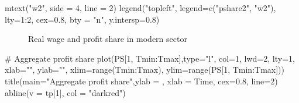 \documentclass[
  letterpaper,
  DIV=11,
  numbers=noendperiod]{scrreprt}
\newenvironment{Shaded}{\begin{snugshade}}{\end{snugshade}}
\newcommand{\AttributeTok}[1]{\textcolor[rgb]{0.40,0.45,0.13}{#1}}
\newcommand{\CommentTok}[1]{\textcolor[rgb]{0.37,0.37,0.37}{#1}}
\newcommand{\DecValTok}[1]{\textcolor[rgb]{0.68,0.00,0.00}{#1}}
\newcommand{\FloatTok}[1]{\textcolor[rgb]{0.68,0.00,0.00}{#1}}
\newcommand{\FunctionTok}[1]{\textcolor[rgb]{0.28,0.35,0.67}{#1}}
\newcommand{\NormalTok}[1]{\textcolor[rgb]{0.00,0.23,0.31}{#1}}
\newcommand{\SpecialCharTok}[1]{\textcolor[rgb]{0.37,0.37,0.37}{#1}}
\newcommand{\StringTok}[1]{\textcolor[rgb]{0.13,0.47,0.30}{#1}}
\begin{document}
\begin{Shaded}
\begin{Highlighting}[]
\FunctionTok{mtext}\NormalTok{(}\StringTok{"w2"}\NormalTok{, }\AttributeTok{side =} \DecValTok{4}\NormalTok{, }\AttributeTok{line =} \DecValTok{2}\NormalTok{)}
\FunctionTok{legend}\NormalTok{(}\StringTok{"topleft"}\NormalTok{, }\AttributeTok{legend=}\FunctionTok{c}\NormalTok{(}\StringTok{"pshare2"}\NormalTok{, }\StringTok{"w2"}\NormalTok{),}
       \AttributeTok{lty=}\DecValTok{1}\SpecialCharTok{:}\DecValTok{2}\NormalTok{, }\AttributeTok{cex=}\FloatTok{0.8}\NormalTok{, }\AttributeTok{bty =} \StringTok{"n"}\NormalTok{, }\AttributeTok{y.intersp=}\FloatTok{0.8}\NormalTok{)}
\end{Highlighting}
\end{Shaded}

\begin{figure}[H]


\caption{\label{fig-wage}Real wage and profit share in modern sector}

\end{figure}%

\begin{Shaded}
\begin{Highlighting}[]
\CommentTok{\# Aggregate profit share}
\FunctionTok{plot}\NormalTok{(PS[}\DecValTok{1}\NormalTok{, Tmin}\SpecialCharTok{:}\NormalTok{Tmax],}\AttributeTok{type=}\StringTok{"l"}\NormalTok{, }\AttributeTok{col=}\DecValTok{1}\NormalTok{, }\AttributeTok{lwd=}\DecValTok{2}\NormalTok{, }\AttributeTok{lty=}\DecValTok{1}\NormalTok{, }\AttributeTok{xlab=}\StringTok{""}\NormalTok{, }\AttributeTok{ylab=}\StringTok{""}\NormalTok{, }\AttributeTok{xlim=}\FunctionTok{range}\NormalTok{(Tmin}\SpecialCharTok{:}\NormalTok{Tmax), }\AttributeTok{ylim=}\FunctionTok{range}\NormalTok{(PS[}\DecValTok{1}\NormalTok{, Tmin}\SpecialCharTok{:}\NormalTok{Tmax])) }
\FunctionTok{title}\NormalTok{(}\AttributeTok{main=}\StringTok{"Aggregate profit share"}\NormalTok{,}\AttributeTok{ylab =} \StringTok{\textquotesingle{}\textquotesingle{}}\NormalTok{, }\AttributeTok{xlab =} \StringTok{\textquotesingle{}Time\textquotesingle{}}\NormalTok{, }\AttributeTok{cex=}\FloatTok{0.8}\NormalTok{, }\AttributeTok{line=}\DecValTok{2}\NormalTok{)}
\FunctionTok{abline}\NormalTok{(}\AttributeTok{v =}\NormalTok{ tp[}\DecValTok{1}\NormalTok{], }\AttributeTok{col =} \StringTok{"darkred"}\NormalTok{)}
\end{Highlighting}
\end{Shaded}
\end{document}
